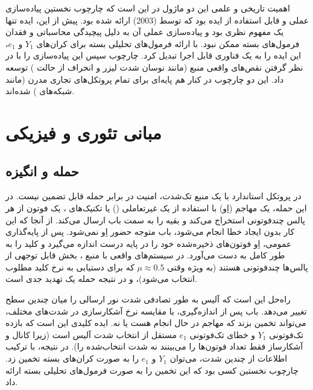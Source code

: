 اهمیت تاریخی و علمی این دو ماژول در این است که چارچوب  نخستین پیاده‌سازی عملی و قابل استفاده از ایده  بود که توسط  (2003) ارائه شده بود. پیش از این، ایده  تنها یک مفهوم نظری بود و پیاده‌سازی عملی آن به دلیل پیچیدگی محاسباتی و فقدان فرمول‌های بسته ممکن نبود.  با ارائه فرمول‌های تحلیلی بسته برای کران‌های $Y_1$ و $e_1$، این ایده را به یک فناوری قابل اجرا تبدیل کرد. چارچوب  سپس این پیاده‌سازی را با در نظر گرفتن نقص‌های واقعی منبع (مانند نوسان شدت لیزر و انحراف از حالت ) توسعه داد. این دو چارچوب در کنار هم پایه‌ای برای تمام پروتکل‌های  تجاری مدرن (مانند شبکه‌های ) شده‌اند.

\section{مبانی تئوری و فیزیکی}

\subsection{حمله  و انگیزه }

در پروتکل استاندارد  با یک منبع تک‌شدت، امنیت در برابر حمله  قابل تضمین نیست. در این حمله، یک مهاجم (اِو) با استفاده از یک  غیرتعاملی () یا تکنیک‌های ، یک فوتون از هر پالس چندفوتونی استخراج می‌کند و بقیه را به سمت باب ارسال می‌کند. از آنجا که این کار بدون ایجاد خطا انجام می‌شود، باب متوجه حضور اِو نمی‌شود. پس از پایه‌گذاری عمومی، اِو فوتون‌های ذخیره‌شده خود را در پایه درست اندازه می‌گیرد و کلید را به طور کامل به دست می‌آورد. در سیستم‌های واقعی با منبع ، بخش قابل توجهی از پالس‌ها چندفوتونی هستند (به ویژه وقتی $\mu \approx 0.5$ که برای دستیابی به نرخ کلید مطلوب انتخاب می‌شود)، و در نتیجه حمله  یک تهدید جدی است.

راه‌حل  این است که آلیس به طور تصادفی شدت نور ارسالی را میان چندین سطح تغییر می‌دهد. باب پس از اندازه‌گیری، با مقایسه نرخ آشکارسازی در شدت‌های مختلف، می‌تواند تخمین بزند که مهاجم در حال انجام  هست یا نه. ایده کلیدی این است که بازده تک‌فوتونی $Y_1$ و خطای تک‌فوتونی $e_1$ مستقل از انتخاب شدت آلیس است (زیرا کانال و آشکارساز فقط تعداد فوتون‌ها را می‌بینند نه شدت انتخاب‌شده را). در نتیجه، با ترکیب اطلاعات از چندین شدت، می‌توان $Y_1$ و $e_1$ را به صورت کران‌های بسته تخمین زد. چارچوب  نخستین کسی بود که این تخمین را به صورت فرمول‌های تحلیلی بسته ارائه داد.

